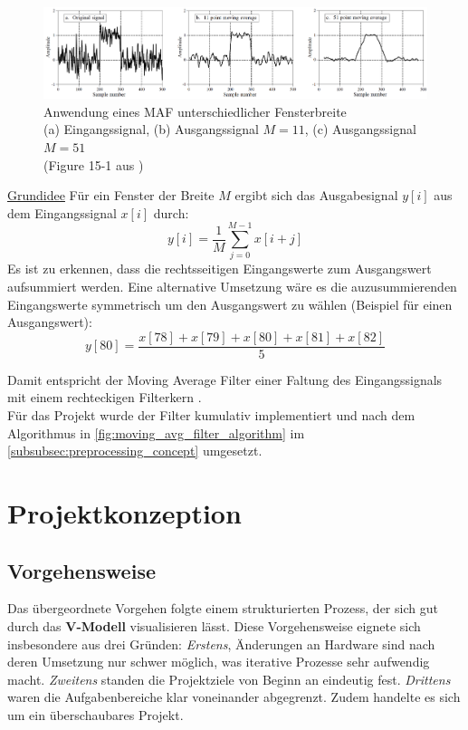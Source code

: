 \documentclass[a4paper, portrait, 12pt]{scrartcl} %
\begin{document}
\begin{figure}[H]
	\centering
    \includegraphics[scale=0.65]{moving_average_filter_signal_smith.png} 
	\caption{\centering Anwendung eines MAF unterschiedlicher Fensterbreite\\
				\footnotesize
				(a) Eingangssignal, (b) Ausgangssignal $M=11$, (c) Ausgangssignal $M=51$\\				(Figure 15-1 aus \cite[S. 279]{Smith1999})}
	\label{fig:mov_avg_filter_signal}
\end{figure}

\underline{Grundidee}
Für ein Fenster der Breite $M$ ergibt sich das Ausgabesignal $y[i]$ aus dem Eingangssignal $x[i]$ durch:
\begin{equation}
	y[i]=\frac{1}{M}\sum_{j=0}^{M-1}x[i+j]
\end{equation}
Es ist zu erkennen, dass die rechtsseitigen Eingangswerte zum Ausgangswert aufsummiert werden. Eine alternative Umsetzung wäre es die auzusummierenden Eingangswerte symmetrisch um den Ausgangswert zu wählen (Beispiel für einen Ausgangswert):
\begin{equation}
	y[80]=\frac{x[78]+x[79]+x[80]+x[81]+x[82]}{5}
\end{equation}

Damit entspricht der Moving Average Filter einer Faltung des Eingangssignals mit einem rechteckigen Filterkern \cite[S. 277f]{Smith1999}.\\

Für das Projekt wurde der Filter kumulativ implementiert und nach dem Algorithmus in \autoref{fig:moving_avg_filter_algorithm} im \autoref{subsubsec:preprocessing_concept} umgesetzt.

\section{Projektkonzeption}
\subsection{Vorgehensweise}
Das übergeordnete Vorgehen folgte einem strukturierten Prozess, der sich gut durch das \textbf{V-Modell} visualisieren lässt. Diese Vorgehensweise eignete sich insbesondere aus drei Gründen: \emph{Erstens}, Änderungen an Hardware sind nach deren Umsetzung nur schwer möglich, was iterative Prozesse sehr aufwendig macht. \emph{Zweitens} standen die Projektziele von Beginn an eindeutig fest. \emph{Drittens} waren die Aufgabenbereiche klar voneinander abgegrenzt. Zudem handelte es sich um ein überschaubares Projekt.
\end{document}

